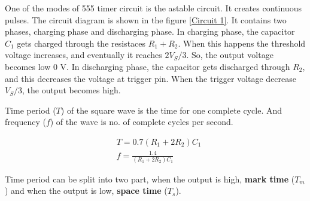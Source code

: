 \documentclass[12pt]{article}
\begin{document}
One of the modes of 555 timer circuit is the astable circuit. It creates continuous pulses. The circuit diagram is shown in the figure \ref{Circuit 1}. It contains two phases, charging phase and discharging phase. In charging phase, the capacitor $C_1$ gets charged through the resistaces $R_1 + R_2$. When this happens the threshold voltage increases, and eventually it reaches $2 V_S/3$. So, the output voltage becomes low 0 V. In discharging phase, the capacitor gets discharged through $R_2$, and this decreases the voltage at trigger pin. When the trigger voltage decrease $V_S/3$, the output becomes high.

Time period ($T$) of the square wave is the time for one complete cycle. And frequency ($f$) of the wave is no. of complete cycles per second.

\begin{equation}
	\begin{split}
		&T = 0.7 (R_1 + 2 R_2) C_1 \\
		&f = \frac{1.4}{(R_1 + 2 R_2) C_1}
	\end{split}
\label{equation_1}
	\end{equation}

Time period can be split into two part, when the output is high, \textbf{mark time} ($T_m$) and when the output is low,  \textbf{space time} ($T_s$).
\end{document}
